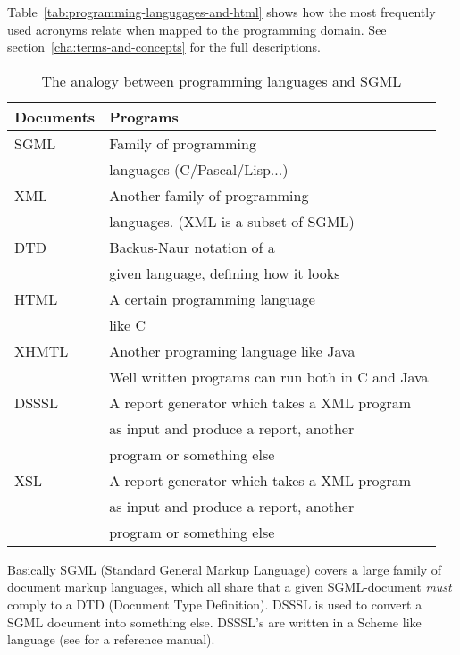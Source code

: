 Table~\vref{tab:programming-langugages-and-html} shows how the most
frequently used acronyms relate when mapped to the programming domain.
See section~\vref{cha:terms-and-concepts} for the full descriptions.


\begin{table}[htbp]
  \begin{center}
    \begin{tabular}{|l|l|}
      \hline\hline
      \textbf{Documents} &  \textbf{Programs} \\
      \hline
      SGML &Family of programming \\
           & languages  (C/Pascal/Lisp...) \\
      \hline
      XML  & Another family of programming \\
           & languages. (XML is a subset of SGML) \\
      \hline
      DTD  & \textsf{Backus}-Naur notation of a \\
           & given language, defining how it looks\\
      \hline
      HTML & A certain programming language\\
           & like C \\
      \hline
      XHMTL & Another programing language like Java \\
           & Well written programs can run both in C and Java\\
      \hline
      DSSSL & A report generator which takes a XML program \\
           & as input and produce a report, another\\
           & program or something else \\
      \hline
      XSL  & A report generator which takes a XML program \\
           & as input and produce a report, another\\
           & program or something else \\
      \hline
    \end{tabular}
    \caption{The analogy between programming languages and SGML}
    \label{tab:programming-langugages-and-html}
  \end{center}
\end{table}

Basically SGML (Standard General Markup Language) covers a large
family of document markup languages, which all share that a given
SGML-document \textit{must} comply to a DTD (Document Type
Definition).  DSSSL is used to convert a SGML document into something
else.  DSSSL's are written in a Scheme like language (see
\cite{Dybvig:1996:SPL} for a reference manual).

